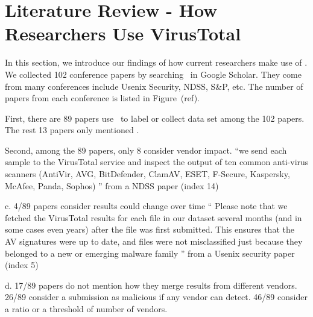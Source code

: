 \section{Literature Review - How Researchers Use VirusTotal}

In this section, we introduce our findings of how current researchers make use of \vt. We collected 102 conference papers by searching \vt\ in Google Scholar. They come from many conferences include Usenix Security, NDSS, S\&P, etc. The number of papers from each conference is listed in Figure~(ref).

First, there are 89 papers use \vt\ to label or collect data set among the 102 papers. The rest 13 papers only mentioned \vt. 

Second, among the 89 papers, only 8 consider vendor impact. 
“we send each sample to the VirusTotal service and inspect the output of ten common anti-virus scanners (AntiVir, AVG, BitDefender, ClamAV, ESET, F-Secure, Kaspersky, McAfee, Panda, Sophos)
” from a NDSS paper (index 14)

c. 4/89 papers consider results could change over time
“
Please note that we fetched the VirusTotal results for each file in our dataset several months (and in some cases even years) after the file was first submitted. This ensures that the AV signatures were up to date, and files were not misclassified just because they belonged to a new or emerging malware family
” from a Usenix security paper (index 5)

d. 17/89 papers do not mention how they merge results from different vendors. 26/89 consider a submission as malicious if any vendor can detect. 46/89 consider a ratio or a threshold of number of vendors. 


